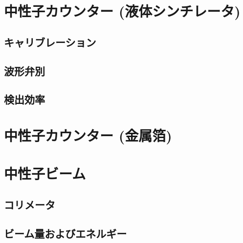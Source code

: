 \section{中性子カウンター (液体シンチレータ)}
\subsection{キャリブレーション}
\subsection{波形弁別}
\subsection{検出効率}

\section{中性子カウンター (金属箔)}

\section{中性子ビーム}
\subsection{コリメータ}
\subsection{ビーム量およびエネルギー}
